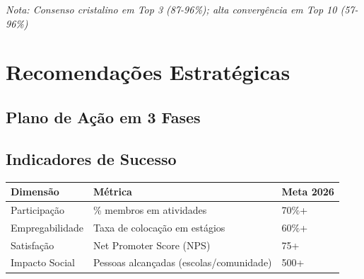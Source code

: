 \documentclass[12pt,a4paper,oneside]{article}
\begin{document}
\vspace{1cm}

{\color{spe-secondary}\small\itshape Nota: Consenso cristalino em Top 3 (87-96\%); alta convergência em Top 10 (57-96\%)}

\newpage

\section{Recomendações Estratégicas}

\subsection{Plano de Ação em 3 Fases}

\noindent{}

\vspace{1.5cm}

\subsection{Indicadores de Sucesso}

\begin{tabular}{|l|p{5cm}|p{3cm}|}
\hline
\textbf{\color{spe-primary}Dimensão} & \textbf{\color{spe-primary}Métrica} & \textbf{\color{spe-primary}Meta 2026} \\
\hline
Participação & \% membros em atividades & 70\%+ \\
\hline
Empregabilidade & Taxa de colocação em estágios & 60\%+ \\
\hline
Satisfação & Net Promoter Score (NPS) & 75+ \\
\hline
Impacto Social & Pessoas alcançadas (escolas/comunidade) & 500+ \\
\hline
\end{tabular}
\end{document}
